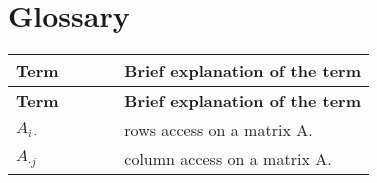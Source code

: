 \documentclass[main]{subfiles}
\begin{document}
\section{Glossary}
\renewcommand{\arraystretch}{1.5}


\begin{longtable}{p{0.3\linewidth} p{0.7\linewidth}}
\hline \textbf{Term} & \textbf{Brief explanation of the term}\\ \hline
\endfirsthead

\hline \textbf{Term} & \textbf{Brief explanation of the term}\\ \hline\hline
\endhead
$A_{i\cdot}$ & rows access on a matrix A.\\
$A_{\cdot j}$ & column access on a matrix A.\\

\end{longtable}
\end{document}
